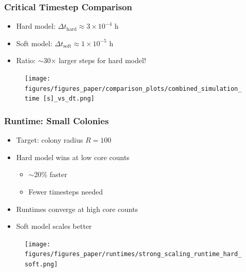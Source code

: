 \documentclass[
	10pt,
	t
]{beamer}
\begin{document}
\begin{frame}
    \frametitle{Critical Timestep Comparison}

    \begin{itemize}
        \item Hard model: $\Delta t_{\text{hard}} \approx 3 \times 10^{-4}$ h
        \item Soft model: $\Delta t_{\text{soft}} \approx 1 \times 10^{-5}$ h
        \item Ratio: $\sim$30$\times$ larger steps for hard model!
    \end{itemize}

    \vspace{0.2cm}

    \begin{figure}
        \centering
        \texttt{[image: figures/figures\_paper/comparison\_plots/combined\_simulation\_time [s]\_vs\_dt.png]}
    \end{figure}

\end{frame}

\begin{frame}
    \frametitle{Runtime: Small Colonies}

    \begin{itemize}
        \item Target: colony radius $R = 100$
        \item Hard model wins at low core counts
              \begin{itemize}
                  \item $\sim$20\% faster
                  \item Fewer timesteps needed
              \end{itemize}
        \item Runtimes converge at high core counts
        \item Soft model scales better
    \end{itemize}

    \vspace{0.2cm}

    \begin{figure}
        \centering
        \texttt{[image: figures/figures\_paper/runtimes/strong\_scaling\_runtime\_hard\_soft.png]}
    \end{figure}

\end{frame}
\end{document}
